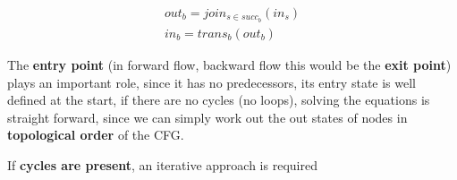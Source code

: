 \documentclass{article}
\begin{document}
{{            \begin{align}
                out_{b} = join_{s\in succ_{b}}(in_{s})\\
                in_{b} = trans_{b}(out_{b}) 
            \end{align}

            The \textbf{entry point} (in forward flow, backward flow this would be the \textbf{exit point}) plays an important role, since it has no predecessors, its entry state is well defined at the start, if there are no cycles (no loops), solving the equations is straight forward, since we can simply work out the out states of nodes in \textbf{topological order} of the CFG.

            If \textbf{cycles are present}, an iterative approach is required
            \begin{center}
            \end{center}
            }
    }
\end{document}
